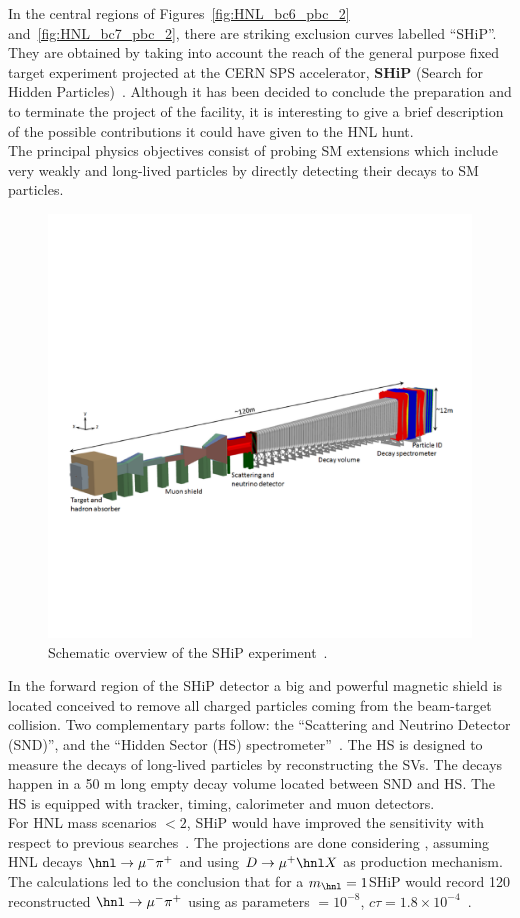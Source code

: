 In the central regions of Figures~\ref{fig:HNL_bc6_pbc_2}
and~\ref{fig:HNL_bc7_pbc_2}, there are striking exclusion curves
labelled ``SHiP''. They are obtained by taking into account the reach of
the general purpose fixed target experiment projected at the CERN SPS
accelerator, \textbf{SHiP} (Search for Hidden Particles)~\cite{bonivento2013proposal,
  shipcollaboration2015facility}. Although it has been decided to
conclude the preparation and to terminate the project of the facility,
it is interesting to give a brief description of the possible
contributions it could have given to the HNL hunt.\\
The principal physics objectives consist of probing SM extensions
which include very weakly and long-lived particles by directly
detecting their decays to SM particles.
\begin{figure}[h!]
\centering
    \includegraphics[clip,trim=0.3cm 5cm 1.cm 7cm, width=.75\textwidth]{Figures/c7/ship.pdf}
\caption{Schematic overview of the SHiP experiment~\cite{CERN-SHiP-NOTE-2018-001}.
}
\label{fig:ship1}
\end{figure}
In the forward region of the SHiP detector a big and powerful 
magnetic shield is located conceived to remove all charged particles
coming from the beam-target collision. Two complementary
parts follow: the ``Scattering and Neutrino
Detector (SND)'', and the ``Hidden Sector (HS)
spectrometer''~\cite{CERN-SHiP-NOTE-2018-001}. The HS is designed to
measure the decays of long-lived particles by reconstructing the
SVs. The decays happen in a 50 m long empty decay volume located
between SND and HS. The HS is equipped with 
tracker, timing, calorimeter and muon detectors. \\
For HNL mass scenarios $<2$\GeV, SHiP would have improved the sensitivity
with respect to previous searches~\cite{bonivento2013proposal}.
The projections are done considering \mixparm, assuming HNL decays $\hnl
\rightarrow \mu ^{-} \pi^{+}$ and using $D
\rightarrow \mu ^{+} \hnl X$ as production mechanism. The calculations
led to the conclusion that for a $m_\hnl = 1$\GeV SHiP would record
120 reconstructed $\hnl
\rightarrow \mu ^{-} \pi^{+}$ using as parameters \mixparm $= 10^{-8}$,
$c\tau = 1.8 \times 10^{-4}$~\cite{bonivento2013proposal}. \\

